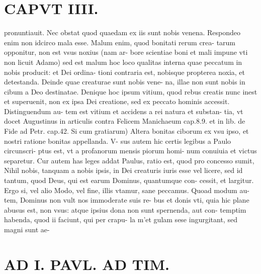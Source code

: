 \documentclass{article}
\begin{document}
\begin{pages}
\section*{CAPVT  IIII. }
\marginpar{[ p.1. ]}\pstart pronuntiauit. Nec obstat quod quaedam ex iis sunt nobis venena. Respondeo enim non idcirco mala esse. Malum enim, quod bonitati rerum crea- tarum opponitur, non est vsus noxius (nam ar- bore scientiae boni et mali impune vti non licuit Adamo) sed est malum hoc loco qualitas interna quae peccatum in nobis producit: et Dei ordina- tioni contraria est, nobisque propterea noxia, et detestanda. Deinde quae creaturae sunt nobis vene- na, illae non sunt nobis in cibum a Deo destinatae. Denique hoc ipsum vitium, quod rebus creatis nunc inest et superuenit, non ex ipsa Dei creatione, sed ex peccato hominis accessit. Distinguendum au- tem est vitium et accidens a rei natura et substan- tia, vt docet Augustinus in articulis contra Felicem Manichaeum cap.8.9. et in lib.  de Fide ad Petr. cap.42. Si cum gratiarum) Altera bonitas ciborum ex vsu ipso, et nostri ratione bonitas appellanda. V- sus autem hic certis legibus a Paulo circunscri- ptus est, vt a profanorum mensis piorum homi- num conuiuia et victus separetur. Cur autem has leges addat Paulus, ratio est, quod pro concesso sumit, Nihil nobis, tanquam a nobis ipsis, in Dei creaturis iuris esse vel licere, sed id tantum, quod Deus, qui est earum Dominus, quantumque con- cessit, et largitur. Ergo si, vel alio Modo, vel fine, illis vtamur, sane peccamus. Quoad modum au- tem, Dominus non vult nos immoderate suis re- bus et donis vti, quia hic plane abusus est, non vsus: atque ipsius dona non sunt spernenda, aut con- temptim habenda, quod ii faciunt, qui per crapu- la m'et gulam sese ingurgitant, sed magni sunt ae-  \pend
\section*{AD I. PAVL. AD TIM. }
\marginpar{[ p.450 ]}\pstart {}
{}

\end{pages}
\end{document}
